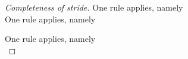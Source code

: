 \begin{proof}[Completeness of stride]






  { One rule applies, namely \\
   }
  {One rule applies, namely \\
  }

   {One rule applies, namely \\
  }


\end{proof}
